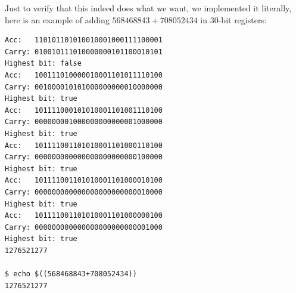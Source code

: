 \documentclass[10pt,a4paper]{scrartcl}
\begin{document}
Just to verify that this indeed does what we want, we implemented it literally, here is an
example of adding $568468843+708052434$ in 30-bit registers:
\begin{verbatim}
Acc:   110101101010010001000111100001
Carry: 010010111010000000101100010101
Highest bit: false
Acc:   100111010000010001101011110100
Carry: 001000010101000000000010000000
Highest bit: true
Acc:   101111000101010001101001110100
Carry: 000000001000000000000001000000
Highest bit: true
Acc:   101111001101010001101000110100
Carry: 000000000000000000000000100000
Highest bit: true
Acc:   101111001101010001101000010100
Carry: 000000000000000000000000010000
Highest bit: true
Acc:   101111001101010001101000000100
Carry: 000000000000000000000000001000
Highest bit: true
1276521277

$ echo $((568468843+708052434))
1276521277
\end{verbatim}
\end{document}
